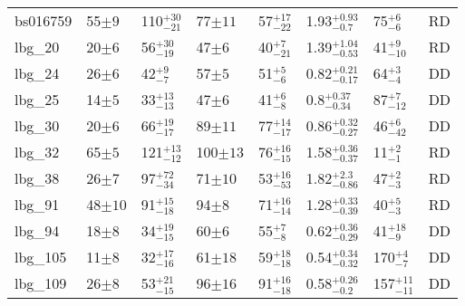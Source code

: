 \documentclass[fleqn,usenatbib]{mnras}
\begin{document}
\begin{table*}
\begin{threeparttable}
\begin{tabular}{llllllll}
bs016759        & 55$\pm9$                    & 110$^{+30}_{-21}$                    & 77$\pm11$                  & 57$^{+17}_{-22}$         & 1.93$^{+0.93}_{-0.7}$               & 75$^{+6}_{-6}$ & RD    \\[1ex]
lbg\_20         & 20$\pm6$                    & 56$^{+30}_{-19}$                     & 47$\pm6$                  & 40$^{+7}_{-21}$         & 1.39$^{+1.04}_{-0.53}$              & 41$^{+9}_{-10}$ & RD   \\[1ex]
lbg\_24         & 26$\pm6$                    & 42$^{+9}_{-7}$                     & 57$\pm5$                  & 51$^{+5}_{-6}$           & 0.82$^{+0.21}_{-0.17}$          & 64$^{+3}_{-4}$ & DD   \\[1ex]
lbg\_25         & 14$\pm5$                    & 33$^{+13}_{-13}$                     & 47$\pm6$                  & 41$^{+6}_{-8}$         & 0.8$^{+0.37}_{-0.34}$                  & 87$^{+7}_{-12}$  & DD   \\[1ex]
lbg\_30         & 20$\pm6$                    & 66$^{+19}_{-17}$                    & 89$\pm11$                 & 77$^{+14}_{-17}$       & 0.86$^{+0.32}_{-0.27}$               & 46$^{+6}_{-42}$ & DD \\[1ex]
lbg\_32         & 65$\pm5$                    & 121$^{+13}_{-12}$                    & 100$\pm13$                 & 76$^{+16}_{-15}$       & 1.58$^{+0.36}_{-0.37}$               & 11$^{+2}_{-1}$ & RD \\[1ex]
lbg\_38         & 26$\pm7$                    & 97$^{+72}_{-34}$                     & 71$\pm10$                  & 53$^{+16}_{-53}$       & 1.82$^{+2.3}_{-0.86}$               & 47$^{+2}_{-3}$  & RD   \\[1ex]
lbg\_91         & 48$\pm10$                    & 91$^{+15}_{-18}$                     & 94$\pm8$                  & 71$^{+16}_{-14}$        & 1.28$^{+0.33}_{-0.39}$              & 40$^{+5}_{-3}$  & RD  \\[1ex]
lbg\_94         & 18$\pm8$                    & 34$^{+19}_{-15}$                     & 60$\pm6$                  & 55$^{+7}_{-8}$         & 0.62$^{+0.36}_{-0.29}$                & 41$^{+18}_{-9}$  & DD  \\[1ex]
lbg\_105        & 11$\pm8$                    & 32$^{+17}_{-16}$                     & 61$\pm18$                  & 59$^{+18}_{-18}$        & 0.54$^{+0.34}_{-0.32}$                & 170$^{+4}_{-7}$ & DD  \\[1ex]
lbg\_109        & 26$\pm8$                    & 53$^{+21}_{-15}$                     & 96$\pm16$                 & 91$^{+16}_{-18}$      & 0.58$^{+0.26}_{-0.2}$                & 157$^{+11}_{-11}$ & DD  \\[1ex]

\end{tabular}
\end{threeparttable}
\end{table*}
\end{document}
